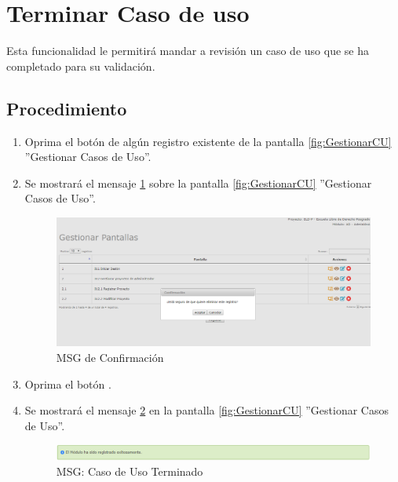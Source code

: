 \hypertarget{cv:terminarCU}{\section{Terminar Caso de uso}} \label{sec:terminarCU}

	Esta funcionalidad le permitirá mandar a revisión un caso de uso que se ha completado para su validación.
		\subsection{Procedimiento}

			\begin{enumerate}
			
			\item Oprima el botón \IUTerminar{} de algún registro existente de la pantalla \ref{fig:GestionarCU} ''Gestionar Casos de Uso''.
	
			\item Se mostrará el mensaje \ref{fig:confirmaTerminaCU} sobre la pantalla \ref{fig:GestionarCU} ''Gestionar Casos de Uso''.
			
			\begin{figure}[htbp!]
				\begin{center}
					\includegraphics[scale=0.5]{roles/lider/casosUso/pantallas/IU11-3MSG10}
					\caption{MSG de Confirmación}
					\label{fig:confirmaTerminaCU}
				\end{center}
			\end{figure}
				
				\item Oprima el botón \IUAceptar.
				
				\item Se mostrará el mensaje \ref{fig:CUTerminado} en la pantalla \ref{fig:GestionarCU} ''Gestionar Casos de Uso''.
				
				\begin{figure}[htbp!]
					\begin{center}
						\includegraphics[scale=0.6]{roles/lider/casosUso/pantallas/IU5-1MSG1}
						\caption{MSG: Caso de Uso Terminado}
						\label{fig:CUTerminado}
					\end{center}
				\end{figure}
			
			\end{enumerate}